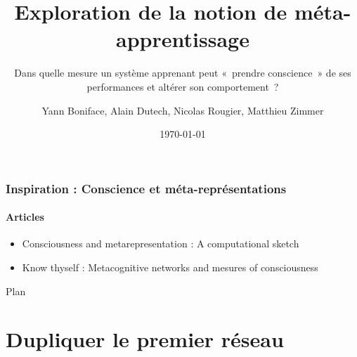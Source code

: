 \documentclass[11pt]{beamer}
\author{Yann Boniface, Alain Dutech, Nicolas Rougier, Matthieu Zimmer}
\title{Exploration de la notion de méta-apprentissage}
\subtitle[\ldots]{Dans quelle mesure un système apprenant peut « prendre conscience » de ses performances et altérer son comportement ?}
\institute{Loria}
\date{\today}
\begin{document}
\maketitle



\begin{frame}
 \frametitle{Inspiration : Conscience et méta-représentations}
 \framesubtitle{Articles}
 
 \begin{itemize}
  \item Consciousness and metarepresentation : A computational sketch
  \item Know thyself : Metacognitive networks and mesures of consciousness
 \end{itemize}
\end{frame}



\begin{frame}
  \begin{center}{\Large Plan }\end{center}
  \tableofcontents[hideallsubsections]
\end{frame}


\section{Dupliquer le premier réseau}
\end{document}
